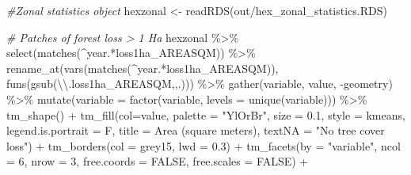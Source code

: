 \documentclass[10pt,landscape,a3paper]{article}
\newenvironment{Shaded}{\begin{snugshade}}{\end{snugshade}}
\newcommand{\AttributeTok}[1]{\textcolor[rgb]{0.77,0.63,0.00}{#1}}
\newcommand{\CommentTok}[1]{\textcolor[rgb]{0.56,0.35,0.01}{\textit{#1}}}
\newcommand{\ConstantTok}[1]{\textcolor[rgb]{0.00,0.00,0.00}{#1}}
\newcommand{\DecValTok}[1]{\textcolor[rgb]{0.00,0.00,0.81}{#1}}
\newcommand{\FloatTok}[1]{\textcolor[rgb]{0.00,0.00,0.81}{#1}}
\newcommand{\FunctionTok}[1]{\textcolor[rgb]{0.00,0.00,0.00}{#1}}
\newcommand{\NormalTok}[1]{#1}
\newcommand{\OtherTok}[1]{\textcolor[rgb]{0.56,0.35,0.01}{#1}}
\newcommand{\SpecialCharTok}[1]{\textcolor[rgb]{0.00,0.00,0.00}{#1}}
\newcommand{\StringTok}[1]{\textcolor[rgb]{0.31,0.60,0.02}{#1}}
\begin{document}
\begin{Shaded}
\begin{Highlighting}[]

\CommentTok{\#Zonal statistics object}
\NormalTok{hexzonal }\OtherTok{\textless{}{-}} \FunctionTok{readRDS}\NormalTok{(}\StringTok{\textquotesingle{}out/hex\_zonal\_statistics.RDS\textquotesingle{}}\NormalTok{)}

\CommentTok{\# Patches of forest loss \textgreater{} 1 Ha}
\NormalTok{hexzonal }\SpecialCharTok{\%\textgreater{}\%} \FunctionTok{select}\NormalTok{(}\FunctionTok{matches}\NormalTok{(}\StringTok{\textquotesingle{}\^{}year.*loss1ha\_AREASQM\textquotesingle{}}\NormalTok{)) }\SpecialCharTok{\%\textgreater{}\%}
  \FunctionTok{rename\_at}\NormalTok{(}\FunctionTok{vars}\NormalTok{(}\FunctionTok{matches}\NormalTok{(}\StringTok{\textquotesingle{}\^{}year.*loss1ha\_AREASQM\textquotesingle{}}\NormalTok{)), }\FunctionTok{funs}\NormalTok{(}\FunctionTok{gsub}\NormalTok{(}\StringTok{\textquotesingle{}}\SpecialCharTok{\textbackslash{}\textbackslash{}}\StringTok{.loss1ha\_AREASQM\textquotesingle{}}\NormalTok{,}\StringTok{\textquotesingle{}\textquotesingle{}}\NormalTok{,.))) }\SpecialCharTok{\%\textgreater{}\%} 
  \FunctionTok{gather}\NormalTok{(variable, value, }\SpecialCharTok{{-}}\NormalTok{geometry) }\SpecialCharTok{\%\textgreater{}\%}
  \FunctionTok{mutate}\NormalTok{(}\AttributeTok{variable =} \FunctionTok{factor}\NormalTok{(variable, }\AttributeTok{levels =} \FunctionTok{unique}\NormalTok{(variable))) }\SpecialCharTok{\%\textgreater{}\%} 
  \FunctionTok{tm\_shape}\NormalTok{() }\SpecialCharTok{+}
  \FunctionTok{tm\_fill}\NormalTok{(}\AttributeTok{col=}\StringTok{\textquotesingle{}value\textquotesingle{}}\NormalTok{, }\AttributeTok{palette =} \StringTok{"YlOrBr"}\NormalTok{, }\AttributeTok{size =} \FloatTok{0.1}\NormalTok{,}
          \AttributeTok{style =} \StringTok{\textquotesingle{}kmeans\textquotesingle{}}\NormalTok{, }\AttributeTok{legend.is.portrait =}\NormalTok{ F, }\AttributeTok{title =} \StringTok{\textquotesingle{}Area (square meters)\textquotesingle{}}\NormalTok{,}
          \AttributeTok{textNA =} \StringTok{"No tree cover loss"}\NormalTok{) }\SpecialCharTok{+}
  \FunctionTok{tm\_borders}\NormalTok{(}\AttributeTok{col =} \StringTok{\textquotesingle{}grey15\textquotesingle{}}\NormalTok{, }\AttributeTok{lwd =} \FloatTok{0.3}\NormalTok{) }\SpecialCharTok{+}
  \FunctionTok{tm\_facets}\NormalTok{(}\AttributeTok{by =} \StringTok{"variable"}\NormalTok{, }\AttributeTok{ncol =} \DecValTok{6}\NormalTok{, }\AttributeTok{nrow =} \DecValTok{3}\NormalTok{, }\AttributeTok{free.coords =} \ConstantTok{FALSE}\NormalTok{, }\AttributeTok{free.scales =} \ConstantTok{FALSE}\NormalTok{) }\SpecialCharTok{+}

\end{Highlighting}
\end{Shaded}
\end{document}

